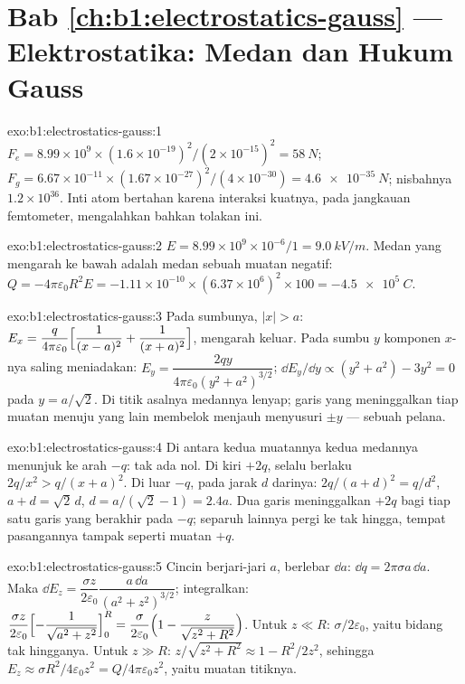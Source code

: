 \section*{Bab \ref{ch:b1:electrostatics-gauss} --- Elektrostatika: Medan dan Hukum Gauss}

\begin{solution}{exo:b1:electrostatics-gauss:1}
$F_e = 8.99 \times 10^9 \times (1.6 \times 10^{-19})^2/(2 \times 10^{-15})^2 = \qty{58}{N}$;
$F_g = 6.67 \times 10^{-11} \times (1.67 \times 10^{-27})^2/(4 \times 10^{-30}) =
\qty{4.6e-35}{N}$; nisbahnya $1.2 \times 10^{36}$. Inti atom bertahan karena
interaksi kuatnya, pada jangkauan femtometer, mengalahkan bahkan tolakan ini.
\end{solution}

\begin{solution}{exo:b1:electrostatics-gauss:2}
$E = 8.99 \times 10^9 \times 10^{-6}/1 = \qty{9.0}{kV/m}$. Medan yang mengarah ke bawah adalah
medan sebuah muatan negatif: $Q = -4\pi\varepsilon_0R^2E = -1.11 \times 10^{-10} \times
(6.37 \times 10^6)^2 \times 100 = \qty{-4.5e5}{C}$.
\end{solution}

\begin{solution}{exo:b1:electrostatics-gauss:3}
Pada sumbunya, $|x| > a$: $E_x = \dfrac{q}{4\pi\varepsilon_0}\Bigl[\dfrac{1}{(x - a)^2} +
\dfrac{1}{(x + a)^2}\Bigr]$, mengarah keluar. Pada sumbu $y$ komponen $x$-nya
saling meniadakan: $E_y = \dfrac{2qy}{4\pi\varepsilon_0(y^2 + a^2)^{3/2}}$; $\dd E_y/\dd y \propto
(y^2 + a^2) - 3y^2 = 0$ pada $y = a/\sqrt2$. Di titik asalnya medannya
lenyap; garis yang meninggalkan tiap muatan menuju yang lain membelok menjauh menyusuri
$\pm y$ --- sebuah pelana.
\end{solution}

\begin{solution}{exo:b1:electrostatics-gauss:4}
Di antara kedua muatannya kedua medannya menunjuk ke arah $-q$: tak ada nol. Di kiri
$+2q$, selalu berlaku $2q/x^2 > q/(x + a)^2$. Di luar $-q$, pada jarak $d$ darinya:
$2q/(a + d)^2 = q/d^2$, $a + d = \sqrt2\,d$, $d = a/(\sqrt2 - 1) = 2.4a$.
Dua garis meninggalkan $+2q$ bagi tiap satu garis yang berakhir pada $-q$; separuh lainnya pergi ke
tak hingga, tempat pasangannya tampak seperti muatan $+q$.
\end{solution}

\begin{solution}{exo:b1:electrostatics-gauss:5}
Cincin berjari-jari $a$, berlebar $\dd a$: $\dd q = 2\pi\sigma a\,\dd a$.
Maka $\dd E_z =
\dfrac{\sigma z}{2\varepsilon_0}\dfrac{a\,\dd a}{(a^2 + z^2)^{3/2}}$; integralkan:
$\dfrac{\sigma z}{2\varepsilon_0}\Bigl[-\dfrac{1}{\sqrt{a^2 + z^2}}\Bigr]_0^R = \dfrac{\sigma}{2\varepsilon_0}
\Bigl(1 - \dfrac{z}{\sqrt{z^2 + R^2}}\Bigr)$. Untuk $z \ll R$: $\sigma/2\varepsilon_0$, yaitu
bidang tak hingganya. Untuk $z \gg R$: $z/\sqrt{z^2 + R^2} \approx 1 - R^2/2z^2$, sehingga $E_z
\approx \sigma R^2/4\varepsilon_0z^2 = Q/4\pi\varepsilon_0z^2$, yaitu muatan titiknya.
\end{solution}

